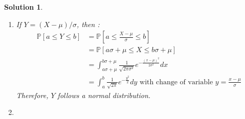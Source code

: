 \documentclass{article}
\newcommand{\proba}[1]{\mathbb{P}[#1]}
\newtheorem{solution}{Solution}
\begin{document}
\begin{solution}
  \begin{enumerate}
    \item If $Y=(X-\mu)/\sigma$, then :
          \begin{align*}
            \proba{a \leq Y \leq b} & = \proba{a \leq \frac{X-\mu}{\sigma} \leq b}                                                                     \\
                                    & = \proba{a\sigma + \mu \leq X \leq b\sigma + \mu}                                                                \\
                                    & = \int_{a\sigma + \mu}^{b\sigma + \mu} \frac{1}{\sqrt{2\pi \sigma^2}} e^{-\frac{{(x-\mu)}^2}{2\sigma^2}} dx      \\
                                    & = \int_a^b \frac{1}{\sqrt{2\pi}} e^{-\frac{y^2}{2}} dy \text{ with change of variable } y = \frac{x-\mu}{\sigma}
          \end{align*}
          Therefore, $Y$ follows a normal distribution.
    \item
  \end{enumerate}
\end{solution}
\end{document}
